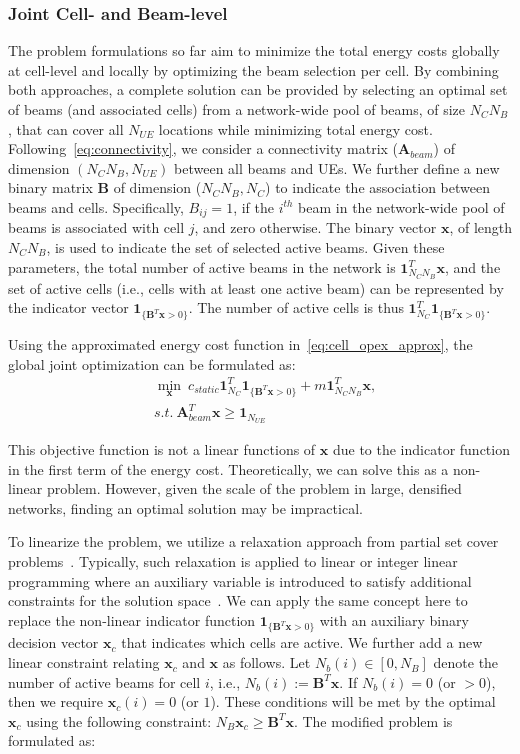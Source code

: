 \subsubsection{Joint Cell- and Beam-level} 
The problem formulations so far aim to minimize the total energy costs globally at cell-level and locally by optimizing the beam selection per cell. 
By combining both approaches, a complete solution can be provided by selecting an optimal set of beams (and associated cells) from a network-wide pool of beams, of size $N_C N_B$, that can cover all $N_{UE}$ locations while minimizing total energy cost.
Following~\eqref{eq:connectivity}, we consider a connectivity matrix ($\bm{A}_{beam}$) of dimension $(N_C N_B, N_{UE})$ between all beams and UEs. 
We further define a new binary matrix $\bm{B}$ of dimension ($N_C N_B, N_C$) to indicate the association between beams and cells. Specifically,  $B_{ij}=1$, if the $i^{th}$ beam in the network-wide pool of beams is associated with cell $j$, and zero otherwise.  
The binary vector $\bm{x}$, of length $N_C N_B$, is used to indicate the set of selected active beams. Given these parameters, the total number of active beams in the network is $\bm{1}_{N_CN_B}^T\bm{x}$, and the set of active cells (i.e., cells with at least one active beam) can be represented by the indicator vector $\bm{1}_{\{\bm{B}^T\bm{x}>0\}}$. The number of active cells is thus $\bm{1}_{N_C}^T\bm{1}_{\{\bm{B}^T\bm{x}>0\}}$. 

Using the approximated energy cost function in~\eqref{eq:cell_opex_approx}, the global joint optimization can be formulated as:
\begin{align}\label{eq:nonlin_prob}
    &  \min_{\bm{x}}~ c_{static}\bm{1}_{N_C}^T\bm{1}_{\{\bm{B}^T\bm{x}>0\}}+ m\bm{1}_{N_CN_B}^T\bm{x}, \\
    &s.t. ~ {\bm{A}_{beam}^T}\bm{x} \ge \bm{1}_{N_{UE}} \nonumber
\end{align}

This objective function is not a linear functions of $\bm{x}$ due to the indicator function in the first term of the energy cost.
Theoretically, we can solve this as a non-linear problem. However, given the scale of the problem in large, densified networks, finding an optimal solution may be impractical.

{To linearize the problem, we utilize a relaxation approach from partial set cover problems~\cite{chekuri2019approximatingpartialsetcover}. Typically, such relaxation is applied to linear or integer linear programming where an auxiliary variable is introduced to satisfy additional constraints for the solution space~\cite{Bragin2022}. We can apply the same concept here to replace} the non-linear indicator function $\bm{1}_{\{\bm{B}^T\bm{x}>0\}}$ with an auxiliary binary decision vector $\bm{x}_c$ that indicates which cells are active. We further add a new linear constraint relating $\bm{x}_c$ and $\bm{x}$ as follows. Let $N_b(i)\in[0,N_B]$ denote the number of active beams for cell $i$, i.e., $N_b(i) := \bm{B}^T\bm{x}$. If $N_b(i)=0$ (or $>0$), then we require $\bm{x}_c(i)=0$ (or $1$). These conditions will be met by the optimal $\bm{x}_c$ using the following constraint: $N_B\bm{x}_c \ge \bm{B}^T\bm{x}$. 
 The modified problem is formulated as:

